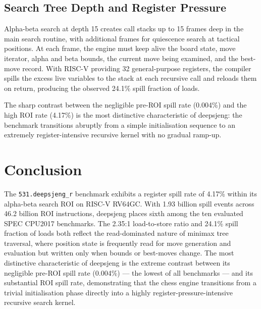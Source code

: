\documentclass[conference]{IEEEtran}
\begin{document}
\subsection{Search Tree Depth and Register Pressure}

Alpha-beta search at depth 15 creates call stacks up to 15 frames deep
in the main search routine, with additional frames for quiescence search
at tactical positions. At each frame, the engine must keep alive the
board state, move iterator, alpha and beta bounds, the current move
being examined, and the best-move record. With RISC-V providing 32
general-purpose registers, the compiler spills the excess live variables
to the stack at each recursive call and reloads them on return,
producing the observed 24.1\% spill fraction of loads.

The sharp contrast between the negligible pre-ROI spill rate (0.004\%)
and the high ROI rate (4.17\%) is the most distinctive characteristic
of deepsjeng: the benchmark transitions abruptly from a simple
initialisation sequence to an extremely register-intensive recursive
kernel with no gradual ramp-up.

\section{Conclusion}

The \texttt{531.deepsjeng\_r} benchmark exhibits a register spill rate
of 4.17\% within its alpha-beta search ROI on RISC-V RV64GC. With 1.93
billion spill events across 46.2 billion ROI instructions, deepsjeng
places sixth among the ten evaluated SPEC CPU2017 benchmarks. The
2.35:1 load-to-store ratio and 24.1\% spill fraction of loads both
reflect the read-dominated nature of minimax tree traversal, where
position state is frequently read for move generation and evaluation
but written only when bounds or best-moves change. The most distinctive
characteristic of deepsjeng is the extreme contrast between its
negligible pre-ROI spill rate (0.004\%) --- the lowest of all benchmarks
--- and its substantial ROI spill rate, demonstrating that the chess
engine transitions from a trivial initialisation phase directly into a
highly register-pressure-intensive recursive search kernel.
\end{document}
